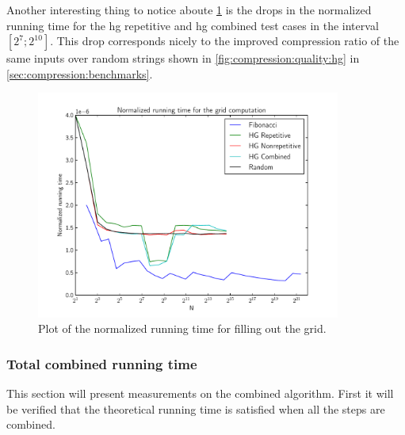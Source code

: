 \documentclass[twoside,11pt,openright]{report}
\begin{document}

Another interesting thing to notice aboute \cref{fig:benchmark:fill-grid-time} is the drops in the normalized running time for the hg repetitive and hg combined test cases in the interval $[2^7; 2^{10}]$. This drop corresponds nicely to the improved compression ratio of the same inputs over random strings shown in \cref{fig:compression:quality:hg} in \cref{sec:compression:benchmarks}.

\begin{figure}[!htb]
  \centering
  \includegraphics[width=10cm]{combined/grid_runningtime}
  \caption{Plot of the normalized running time for filling out the grid.}
  \label{fig:benchmark:fill-grid-time}
\end{figure}


\subsubsection{Total combined running time}
This section will present measurements on the combined algorithm. First it will be verified that the theoretical running time is satisfied when all the steps are combined.
\end{document}
